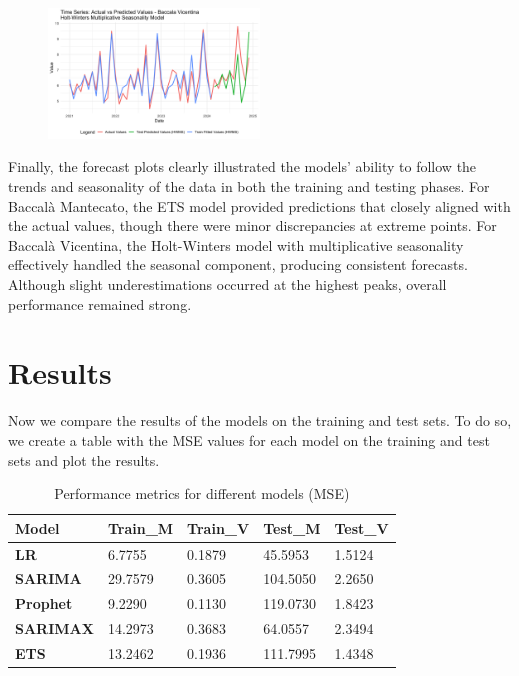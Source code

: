 \documentclass[10pt,twocolumn,letterpaper]{article}
\begin{document}
\begin{figure}[H]
    \centering
    \includegraphics[width=0.5\textwidth]{PlotsBEFD/TS_HWM_V.png} 
    \caption{}
    \label{fig:esempio}
\end{figure}
Finally, the forecast plots clearly illustrated the models' ability to follow the trends and seasonality of the data in both the training and testing phases. For Baccalà Mantecato, the ETS model provided predictions that closely aligned with the actual values, though there were minor discrepancies at extreme points. For Baccalà Vicentina, the Holt-Winters model with multiplicative seasonality effectively handled the seasonal component, producing consistent forecasts. Although slight underestimations occurred at the highest peaks, overall performance remained strong.

\section{Results}

Now we compare the results of the models on the training and test sets. To do so, we create a table with the MSE values for each model on the training and test sets and plot the results.

\begin{table}[H]
\centering
\small
\begin{tabular}{|l|l|l|l|l|}
\hline
\textbf{Model} & \textbf{Train\_M} & \textbf{Train\_V} & \textbf{Test\_M} & \textbf{Test\_V} \\
\hline
\textbf{LR} & 6.7755 & 0.1879 & 45.5953 & 1.5124 \\
\textbf{SARIMA} & 29.7579 & 0.3605 & 104.5050 & 2.2650 \\
\textbf{Prophet} & 9.2290 & 0.1130 & 119.0730 & 1.8423 \\
\textbf{SARIMAX} & 14.2973 & 0.3683 & 64.0557 & 2.3494 \\
\textbf{ETS} & 13.2462 & 0.1936 & 111.7995 & 1.4348 \\
\hline
\end{tabular}
\caption{Performance metrics for different models (MSE)}
\label{table:model_comparison_inverted}
\end{table}
\end{document}
